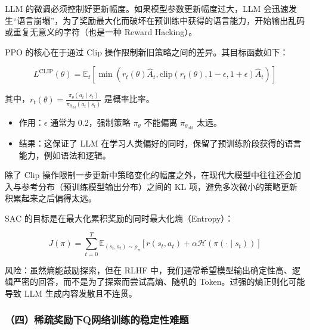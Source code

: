 LLM 的微调必须控制好更新幅度。如果模型参数更新幅度过大，LLM 会迅速发生``语言崩塌''，为了奖励最大化而破坏在预训练中获得的语言能力，开始输出乱码或重复无意义的字符（也是一种 Reward Hacking）。

PPO 的核心在于通过 Clip 操作限制新旧策略之间的差异。其目标函数如下：

\[
L^{\mathrm{CLIP}}(\theta)
=
\mathbb{E}_t
\left[
\min
\left(
r_t(\theta)\hat{A}_t,
\mathrm{clip}(r_t(\theta),1-\epsilon,1+\epsilon)\hat{A}_t
\right)
\right]
\]

其中，\(r_t(\theta)=\frac{\pi_\theta(a_t\mid s_t)}{\pi_{\theta_{\mathrm{old}}}(a_t\mid s_t)}\) 是概率比率。

\begin{itemize}
\tightlist
\item
  作用：\(\epsilon\) 通常为 0.2，强制策略 \(\pi_\theta\) 不能偏离 \(\pi_{\theta_{\mathrm{old}}}\) 太远。
\item
  结果：这保证了 LLM 在学习人类偏好的同时，保留了预训练阶段获得的语言能力，例如语法和逻辑。
\end{itemize}

除了 Clip 操作限制一步更新中策略变化的幅度之外，在现代大模型中往往还会加入与参考分布（预训练模型输出分布）之间的 KL 项，避免多次微小的策略更新积累起来之后偏得太远。

SAC 的目标是在最大化累积奖励的同时最大化熵（Entropy）：

\[
J(\pi)
=
\sum_{t=0}^{T}
\mathbb{E}_{(s_t,a_t)\sim\rho_\pi}
\left[
r(s_t,a_t)
+\alpha\mathcal{H}(\pi(\cdot\mid s_t))
\right]
\]

风险：虽然熵能鼓励探索，但在 RLHF 中，我们通常希望模型输出确定性高、逻辑严密的回答，而不是为了探索而尝试高熵、随机的 Token。过强的熵正则化可能导致 LLM 生成内容发散且不连贯。

\hypertarget{ux56dbux7a00ux758fux5956ux52b1ux4e0bqux7f51ux7edcux8badux7ec3ux7684ux7a33ux5b9aux6027ux96beux9898}{%
\subsubsection{（四）稀疏奖励下Q网络训练的稳定性难题}\label{ux56dbux7a00ux758fux5956ux52b1ux4e0bqux7f51ux7edcux8badux7ec3ux7684ux7a33ux5b9aux6027ux96beux9898}}

